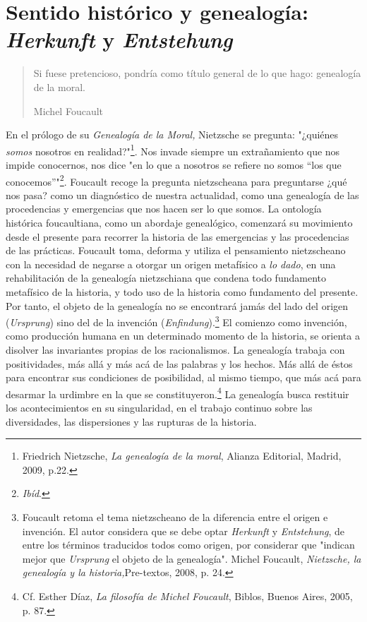 \section{Sentido histórico y genealogía: \emph{Herkunft} y
  \emph{Entstehung}}

\begin{quote}
Si fuese pretencioso, pondría como título general de lo que hago:
genealogía de la moral.

Michel Foucault
\end{quote}

En el prólogo de su \emph{Genealogía de la Moral,} Nietzsche se
pregunta: "¿quiénes \emph{somos} nosotros en realidad?"\footnote{Friedrich
  Nietzsche, \emph{La genealogía de la moral}, Alianza Editorial,
  Madrid, 2009, p.22.}. Nos invade siempre un extrañamiento que nos
impide conocernos, nos dice "en lo que a nosotros se refiere no somos
``los que conocemos''"\footnote{\emph{Ibíd}.}. Foucault recoge la
pregunta nietzscheana para preguntarse ¿qué nos pasa? como un
diagnóstico de nuestra actualidad, como una genealogía de las
procedencias y emergencias que nos hacen ser lo que somos. La ontología
histórica foucaultiana, como un abordaje genealógico, comenzará su
movimiento desde el presente para recorrer la historia de las
emergencias y las procedencias de las prácticas. Foucault toma, deforma
y utiliza el pensamiento nietzscheano con la necesidad de negarse a
otorgar un origen metafísico a \emph{lo dado}, en una rehabilitación de
la genealogía nietzschiana que condena todo fundamento metafísico de la
historia, y todo uso de la historia como fundamento del presente. Por
tanto, el objeto de la genealogía no se encontrará jamás del lado del
origen (\emph{Ursprung}) sino del de la invención
(\emph{Enfindung}).\footnote{Foucault retoma el tema nietzscheano de la
  diferencia entre el origen e invención. El autor considera que se debe
  optar \emph{Herkunft} y \emph{Entstehung}, de entre los términos
  traducidos todos como origen, por considerar que "indican mejor que
  \emph{Ursprung} el objeto de la genealogía". Michel Foucault,
  \emph{Nietzsche, la genealogía y la historia,}Pre-textos, 2008, p. 24.}
El comienzo como invención, como producción humana en un determinado
momento de la historia, se orienta a disolver las invariantes propias de
los racionalismos. La genealogía trabaja con positividades, más allá y
más acá de las palabras y los hechos. Más allá de éstos para encontrar
sus condiciones de posibilidad, al mismo tiempo, que más acá para
desarmar la urdimbre en la que se constituyeron.\footnote{Cf. Esther
  Díaz, \emph{La filosofía de Michel Foucault}, Biblos, Buenos Aires,
  2005, p. 87.} La genealogía busca restituir los acontecimientos en su
singularidad, en el trabajo continuo sobre las diversidades, las
dispersiones y las rupturas de la historia.

